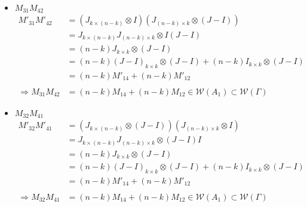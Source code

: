 \documentclass{article}
\begin{document}
\begin{itemize}
\begin{itemize}
\begin{itemize}
            \item $M_{31}M_{42}$
            \begin{align*}
                M'_{31}M'_{42}
                &= (J_{k\times(n-k)}\otimes I)(J_{(n-k)\times k}\otimes (J-I)) \\
                &= J_{k\times(n-k)}J_{(n-k)\times k} \otimes I(J-I) \\
                &= (n-k)J_{k\times k}\otimes (J-I) \\
                &= (n-k)(J-I)_{k\times k}\otimes (J-I) + (n-k)I_{k\times k}\otimes (J-I) \\
                &= (n-k)M'_{14} + (n-k)M'_{12} \\\\
                \Rightarrow M_{31}M_{42} &= (n-k)M_{14} + (n-k)M_{12} \in \mathcal{W}(A_1)\subset\mathcal{W}(\Gamma)
            \end{align*}
            
            \item $M_{32}M_{41}$
            \begin{align*}
                M'_{32}M'_{41}
                &= (J_{k\times(n-k)}\otimes (J-I))(J_{(n-k)\times k}\otimes I) \\
                &= J_{k\times(n-k)}J_{(n-k)\times k} \otimes (J-I)I \\
                &= (n-k)J_{k\times k}\otimes (J-I) \\
                &= (n-k)(J-I)_{k\times k}\otimes (J-I) + (n-k)I_{k\times k}\otimes (J-I) \\
                &= (n-k)M'_{14} + (n-k)M'_{12} \\\\
                \Rightarrow M_{32}M_{41} &= (n-k)M_{14} + (n-k)M_{12} \in \mathcal{W}(A_1)\subset\mathcal{W}(\Gamma)
            \end{align*}
            

\end{itemize}
\end{itemize}
\end{itemize}
\end{document}
